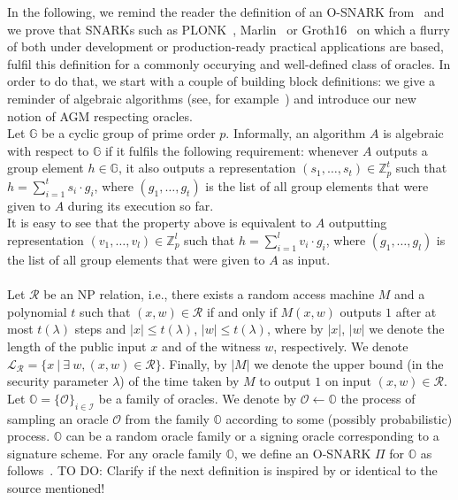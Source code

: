 In the following, we remind the reader the definition of an O-SNARK from~\cite{O_SNARK} and we prove that 
SNARKs such as PLONK~\cite{plonk}, Marlin~\cite{marlin} or Groth16~\cite{groth16} on which a flurry of 
both under development or production-ready practical applications are based, fulfil this definition for a commonly occurying 
and well-defined class of oracles. In order to do that, we start with a couple of building block definitions: we give a 
reminder of algebraic algorithms (see, for example~\cite{AGM_model}) and introduce our new notion of AGM respecting oracles. \\

\noindent Let $\mathbb{G}$ be a cyclic group of prime order $p$. Informally, an algorithm $A$ is algebraic with respect to 
$\mathbb{G}$ if it fulfils the following requirement: whenever $A$ outputs a group element $h \in \mathbb{G}$, 
it also outputs a representation $(s_1, \ldots, s_t) \in \mathbb{Z}^{t}_p$ 
such that $h = \sum_ {i =1}^t s_i \cdot g_i$, where $(g_1,\ldots,g_t)$ is the list of all group elements that were given to 
$A$ during its execution so far. \\

\noindent It is easy to see that the property above is equivalent to $A$ outputting  representation $(v_1, \ldots, v_l) \in \mathbb{Z}^{l}_p$ 
such that $h = \sum_ {i =1}^l v_i \cdot g_i$, where $(g_1,\ldots,g_l)$ is the list of all group elements that were given to $A$ as input. \\

\\
\noindent Let $\mathcal{R}$ be an NP relation, i.e., there exists a random access machine $M$ and a polynomial $t$ 
such that  $(x,w) \in \mathcal{R}$ if and only if $M(x,w)$ outputs $1$ after at most $t(\lambda)$ steps and 
$|x| \leq t(\lambda)$, $|w| \leq t(\lambda)$, where by $|x|$, $|w|$ we denote the length of the public input $x$ 
and of the witness $w$, respectively. We denote $\mathcal{L}_{\mathcal{R}} = \{ x\  | \ \exists \ w,  (x, w) \in \mathcal{R} \}$.  
Finally, by $|M|$ we denote the upper bound (in the security parameter $\lambda$) of the time taken by $M$ to output 
$1$ on input $(x,w) \in \mathcal{R}$.\\

\noindent Let $\mathbb{O} = \{ \mathcal{O} \}_{i \in \mathcal{I}}$ be a family of oracles. We denote by $\mathcal{O} \leftarrow \mathbb{O}$ 
the process of sampling an oracle $\mathcal{O}$ from the family $\mathbb{O}$ according to some (possibly probabilistic) process.
$\mathbb{O}$ can be a random oracle family or a signing oracle corresponding to a signature scheme. For any oracle family 
$\mathbb{O}$, we define an O-SNARK $\Pi$ for $\mathbb{O}$ as follows~\cite{O_SNARK}. {\color{red} TO DO: Clarify if the next definition is inspired by or identical to the source mentioned!} \\

